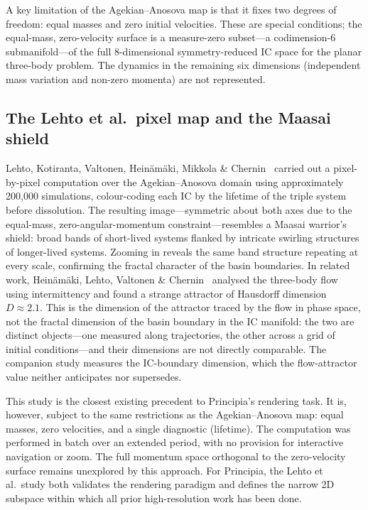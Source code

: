 \documentclass[11pt,a4paper]{article}
\begin{document}
A key limitation of the Agekian--Anosova map is that it fixes two degrees of freedom: equal
masses and zero initial velocities.  These are special conditions; the equal-mass, zero-velocity
surface is a measure-zero subset---a codimension-6 submanifold---of the full 8-dimensional
symmetry-reduced IC space for the planar three-body problem.  The dynamics in the remaining six
dimensions (independent mass variation and non-zero momenta) are not represented.

\subsection{The Lehto et al.\ pixel map and the Maasai shield}

Lehto, Kotiranta, Valtonen, Heinäm\"{a}ki, Mikkola \& Chernin~\cite{lehto2008} carried out a
pixel-by-pixel computation over the Agekian--Anosova domain using approximately 200,000
simulations, colour-coding each IC by the lifetime of the triple system before dissolution.
The resulting image---symmetric about both axes due to the equal-mass, zero-angular-momentum
constraint---resembles a Maasai warrior's shield: broad bands of short-lived systems flanked by
intricate swirling structures of longer-lived systems.  Zooming in reveals the same band
structure repeating at every scale, confirming the fractal character of the basin boundaries.
In related work, Heinäm\"{a}ki, Lehto, Valtonen \& Chernin~\cite{heinamaki1998} analysed the
three-body flow using intermittency and found a strange attractor of Hausdorff dimension
$D \approx 2.1$.  This is the dimension of the attractor traced by the flow in phase space,
not the fractal dimension of the basin boundary in the IC manifold: the two are distinct
objects---one measured along trajectories, the other across a grid of initial conditions---and
their dimensions are not directly comparable.  The companion study measures the IC-boundary
dimension, which the flow-attractor value neither anticipates nor supersedes.

This study is the closest existing precedent to Principia's rendering task.  It is, however,
subject to the same restrictions as the Agekian--Anosova map: equal masses, zero velocities,
and a single diagnostic (lifetime).  The computation was performed in batch over an extended
period, with no provision for interactive navigation or zoom.  The full momentum space
orthogonal to the zero-velocity surface remains unexplored by this approach.  For Principia,
the Lehto et al.\ study both validates the rendering paradigm and defines the narrow 2D subspace
within which all prior high-resolution work has been done.
\end{document}
